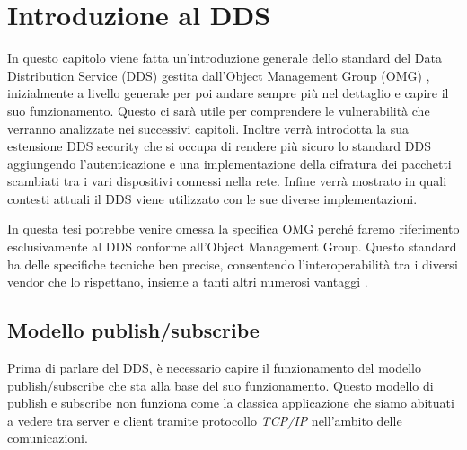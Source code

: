 \chapter{Introduzione al DDS}
\label{introdDDS}

In questo capitolo viene fatta un'introduzione generale dello 
standard del Data Distribution Service (DDS) gestita
dall'Object Management Group (OMG) \cite{8469351},
inizialmente a livello generale 
per poi andare sempre più nel
dettaglio e capire il suo funzionamento. Questo ci sarà utile 
per comprendere le vulnerabilità che verranno analizzate nei
successivi capitoli. Inoltre verrà introdotta la sua estensione 
DDS security che si occupa di rendere più sicuro lo standard DDS 
aggiungendo l'autenticazione e una 
implementazione della cifratura dei pacchetti scambiati tra i vari
dispositivi connessi nella rete. 
Infine verrà mostrato in quali contesti attuali il DDS viene
utilizzato con le sue diverse implementazioni.

In questa tesi potrebbe venire omessa la specifica OMG perché 
faremo riferimento
esclusivamente al DDS conforme all'Object Management Group. Questo 
standard ha delle specifiche tecniche ben precise, consentendo
l'interoperabilità tra i diversi vendor che lo rispettano, insieme
a tanti altri numerosi vantaggi \cite{dds1.4}.


\section{Modello publish/subscribe}
Prima di parlare del DDS, è necessario capire il 
funzionamento del modello publish/subscribe
che sta alla base del suo funzionamento.
Questo modello di publish e subscribe non funziona come la 
classica applicazione che siamo abituati a vedere tra server e
client tramite protocollo \textit{TCP/IP} nell'ambito delle comunicazioni. 


